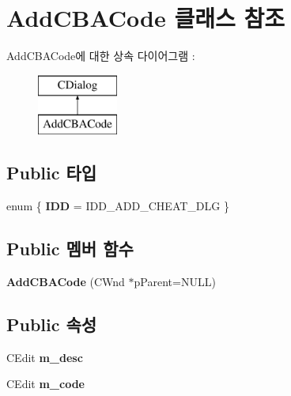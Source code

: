 \hypertarget{class_add_c_b_a_code}{}\section{Add\+C\+B\+A\+Code 클래스 참조}
\label{class_add_c_b_a_code}
Add\+C\+B\+A\+Code에 대한 상속 다이어그램 \+: \begin{figure}[H]
\begin{center}
\leavevmode
\includegraphics[height=2.000000cm]{class_add_c_b_a_code}
\end{center}
\end{figure}
\subsection*{Public 타입}
\begin{DoxyCompactItemize}
\item 
\mbox{\label{class_add_c_b_a_code_ab086df2c41fbfe55405c6ac046dab7a5}} 
enum \{ {\bfseries I\+DD} = I\+D\+D\+\_\+\+A\+D\+D\+\_\+\+C\+H\+E\+A\+T\+\_\+\+D\+LG
 \}
\end{DoxyCompactItemize}
\subsection*{Public 멤버 함수}
\begin{DoxyCompactItemize}
\item 
\mbox{\label{class_add_c_b_a_code_a13fcdd2e1451c66ac0744a631d95fdb8}} 
{\bfseries Add\+C\+B\+A\+Code} (C\+Wnd $\ast$p\+Parent=N\+U\+LL)
\end{DoxyCompactItemize}
\subsection*{Public 속성}
\begin{DoxyCompactItemize}
\item 
\mbox{\label{class_add_c_b_a_code_ab5056f88f9c1f58a20a1ce718599305b}} 
C\+Edit {\bfseries m\+\_\+desc}
\item 
\mbox{\label{class_add_c_b_a_code_ab4b404e9aed23e5dd265f543e98c9c6c}} 
C\+Edit {\bfseries m\+\_\+code}
\end{DoxyCompactItemize}
